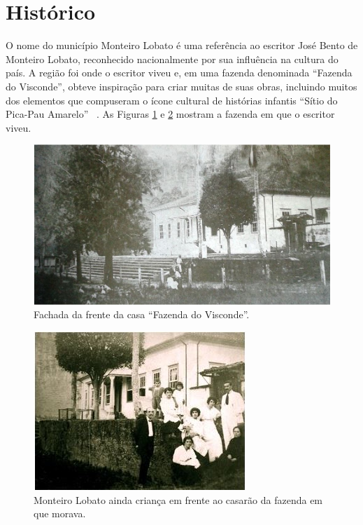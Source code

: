\section{Histórico}

O nome do município Monteiro Lobato é uma referência ao escritor José Bento de Monteiro Lobato, reconhecido nacionalmente por sua influência na cultura do país. A região foi onde o escritor viveu e, em uma fazenda denominada “Fazenda do Visconde”, obteve inspiração para criar muitas de suas obras, incluindo muitos dos elementos que compuseram o ícone cultural de histórias infantis “Sítio do Pica-Pau Amarelo” ~\cite{squeff2003origem,IBGE2010}. As Figuras \ref{fig:image009} e \ref{fig:image010} mostram a fazenda em que o escritor viveu. 
 
\begin{figure}[h!]
	\centering
	\includegraphics[width=0.8\linewidth]{produtos/proddois/image009}
	\caption{Fachada da frente da casa “Fazenda do Visconde”.}
	\label{fig:image009}
\end{figure}

\begin{figure}[h!]
	\centering
	\includegraphics[width=0.55\linewidth]{produtos/proddois/image010}
	\caption{Monteiro Lobato ainda criança em frente ao casarão da fazenda em que morava.}
	\label{fig:image010}
\end{figure}

